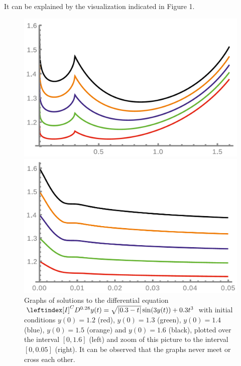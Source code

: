 It can be explained by the visualization indicated in Figure 1.
\begin{figure}[h]
    \begin{minipage}[l]{.5\textwidth}
      \includegraphics[scale = .25]{plot/3.png}
    \end{minipage}  
    \begin{minipage}[r]{.5\textwidth}
      \includegraphics[scale = .25]{plot/4.png}
    \end{minipage} 
    \caption{
        Graphs of solutions to the differential equation $\leftindex[I]^C {D^{0.28}}y(t) = \sqrt{|0.3-t|} \sin(3y(t))+ 0.3t^3$
        with initial conditions $y(0) = 1.2$ (red), $y(0) = 1.3$ (green), $y(0) = 1.4$ (blue), $y(0) = 1.5$ (orange)
        and $y(0) = 1.6$ (black), plotted over the interval $[0, 1.6]$ (left) and zoom of this picture to the interval
        $[0, 0.05]$ (right). It can be observed that the graphs never meet or cross each other.
    } 
\end{figure}

